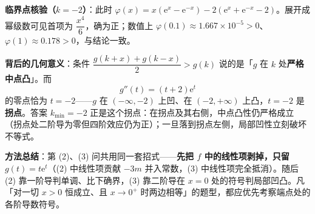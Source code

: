 \begin{answer}
\begin{gktip}
\textbf{临界点核验（$k=-2$）}：此时 $\varphi(x)=x\left(\mathrm e^x-\mathrm e^{-x}\right)-2\left(\mathrm e^x+\mathrm e^{-x}-2\right)$。展开成幂级数可见首项为 $\dfrac{x^4}{6}$，确为正；数值上 $\varphi(0.1)\approx1.667\times10^{-5}>0$、$\varphi(1)\approx0.178>0$，与结论一致。

\textbf{背后的几何意义}：条件 $\dfrac{g(k+x)+g(k-x)}{2}>g(k)$ 说的是「$g$ 在 $k$ 处\textbf{严格中点凸}」。而
\nopagebreak[4]
\[g''(t)=(t+2)\mathrm e^{t}\]
的零点恰为 $t=-2$——$g$ 在 $(-\infty,-2)$ 上凹、在 $(-2,+\infty)$ 上凸，$t=-2$ 是\textbf{拐点}。答案 $k_{\min}=-2$ 正是这个拐点：在拐点及其右侧，中点凸性仍严格成立（拐点处二阶导为零但四阶效应仍为正）；一旦落到拐点左侧，局部凹性立刻破坏不等式。

\textbf{方法总结}：第 (2)、(3) 问共用同一套招式——\textbf{先把 $f$ 中的线性项剥掉，只留 $g(t)=t\mathrm e^t$}（(2) 中线性项贡献 $-3m$ 并入常数，(3) 中线性项完全抵消）。随后 (2) 靠一阶导判单调、比下确界，(3) 靠二阶导在 $x=0$ 处的符号判局部凹凸。凡「对一切 $x>0$ 恒成立、且 $x\to0^+$ 时两边相等」的题型，都应优先考察端点处的各阶导数符号。
\end{gktip}


\gkanswer{答案（2）：$m\in\left[2\ln2,+\infty\right)$}


\end{answer}